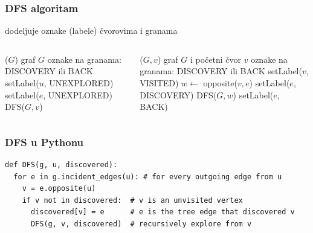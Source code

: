 \documentclass[compress,aspectratio=169]{beamer}
\begin{document}
\begin{frame}[fragile]
  \frametitle{DFS algoritam}
  dodeljuje oznake (labele) čvorovima i granama
  {\footnotesize
  \begin{columns}
    \begin{column}[t]{8cm}
      \begin{algorithmic}
        \STATE {}($G$)
        \REQUIRE graf $G$
        \ENSURE oznake na granama: {\scriptsize DISCOVERY} ili {\scriptsize BACK}
          \STATE setLabel($u$, {\scriptsize UNEXPLORED})
        \ENDFOR
          \STATE setLabel($e$, {\scriptsize UNEXPLORED})
        \ENDFOR
            \STATE DFS($G,v$)
          \ENDIF
        \ENDFOR
      \end{algorithmic}
    \end{column}
    \begin{column}[t]{8cm}
      \begin{algorithmic}
        \STATE {}($G,v$)
        \REQUIRE graf $G$ i početni čvor $v$
        \ENSURE oznake na granama: {\scriptsize DISCOVERY} ili {\scriptsize BACK}
        \STATE setLabel($v$, {\scriptsize VISITED})
            \STATE $w \leftarrow$ opposite($v,e$)
              \STATE setLabel($e$, {\scriptsize DISCOVERY})
              \STATE DFS($G, w$)
            \ELSE
              \STATE setLabel($e$, {\scriptsize BACK})
            \ENDIF
          \ENDIF
        \ENDFOR
      \end{algorithmic}
    \end{column}
  \end{columns}
  }
\end{frame}

\begin{frame}[fragile,shrink=15]
  \frametitle{DFS u Pythonu}
\begin{verbatim}
def DFS(g, u, discovered):
  for e in g.incident_edges(u): # for every outgoing edge from u
    v = e.opposite(u)
    if v not in discovered:  # v is an unvisited vertex
      discovered[v] = e      # e is the tree edge that discovered v
      DFS(g, v, discovered)  # recursively explore from v
\end{verbatim}
\end{frame}
\end{document}
